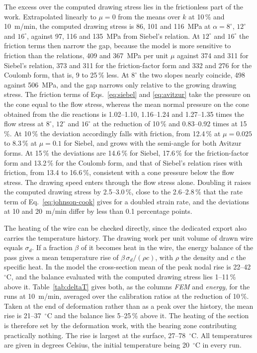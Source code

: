 \documentclass[pdflatex,sn-basic,Numbered]{sn-jnl}
\begin{document}
The excess over the computed drawing stress lies in the frictionless part of the work. Extrapolated linearly to $\mu = 0$ from the means over $k$ at 10\,\% and 10~m/min, the
computed drawing stress is 86, 101 and 116~MPa at $\alpha = 8^\circ$, $12^\circ$ and $16^\circ$,
against 97, 116 and 135~MPa from Siebel's relation. At $12^\circ$ and $16^\circ$ the friction terms
then narrow the gap, because the model is more sensitive to friction than the relations, 409 and
367~MPa per unit $\mu$ against 374 and 311 for Siebel's relation, 373 and 311 for the friction-factor
form and 332 and 276 for the Coulomb form, that is, 9 to 25\,\% less. At $8^\circ$ the two slopes nearly
coincide, 498 against 506~MPa, and the gap narrows only relative to the growing drawing stress.
The friction terms of Eqs.~\eqref{eq:siebel} and \eqref{eq:avitzur} take the pressure on the cone
equal to the flow stress, whereas the mean normal pressure on the cone obtained from the die
reactions is 1.02--1.10, 1.16--1.24 and 1.27--1.35 times the flow stress at $8^\circ$, $12^\circ$
and $16^\circ$ at the reduction of 10\,\% and 0.83--0.92 times at 15\,\%. At 10\,\% the deviation
accordingly falls with friction, from 12.4\,\% at $\mu = 0.025$ to 8.3\,\% at $\mu = 0.1$ for
Siebel, and grows with the semi-angle for both Avitzur forms. At 15\,\% the deviations are
14.6\,\% for Siebel, 17.6\,\% for the friction-factor form and 13.2\,\% for the Coulomb form, and
that of Siebel's relation rises with friction, from 13.4 to 16.6\,\%, consistent with a cone
pressure below the flow stress. The drawing speed enters through the flow stress alone. Doubling
it raises the computed drawing stress by 2.5--3.0\,\%, close to the 2.6--2.8\,\% that the rate
term of Eq.~\eqref{eq:johnson-cook} gives for a doubled strain rate, and the deviations at 10 and
20~m/min differ by less than 0.1 percentage points.

The heating of the wire can be checked directly, since the dedicated export also carries the
temperature history. The drawing work per unit volume of drawn wire equals $\sigma_d$. If a
fraction $\beta$ of it becomes heat in the wire, the energy balance of the pass gives a mean
temperature rise of $\beta\,\sigma_d/(\rho c)$, with $\rho$ the density and $c$ the specific heat.
In the model the cross-section mean of the peak nodal rise is 22--42~$^\circ$C, and the balance
evaluated with the computed drawing stress lies 1--11\,\% above it. Table~\ref{tab:deltaT} gives
both, as the columns \emph{FEM} and \emph{energy}, for the runs at 10~m/min, averaged over the
calibration ratios at the reduction of 10\,\%. Taken at the end of deformation rather than as a
peak over the history, the mean rise is 21--37~$^\circ$C and the balance lies 5--25\,\% above it.
The heating of the section is therefore set by the deformation work, with the bearing zone
contributing practically nothing. The rise is largest at the surface, 27--78~$^\circ$C. All
temperatures are given in degrees Celsius, the initial temperature being 20~$^\circ$C in every run.
\end{document}
